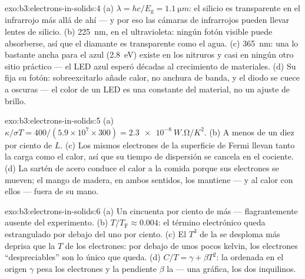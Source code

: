 \begin{solution}{exo:b3:electrons-in-solids:4}
(a) $\lambda = hc/E_{\text{g}} = \qty{1.1}{\micro m}$: el silicio es
transparente en el infrarrojo más allá de ahí --- y por eso las cámaras de
infrarrojos pueden llevar lentes de silicio. (b) \qty{225}{nm}, en el
ultravioleta: ningún fotón visible puede absorberse, así que el diamante es
transparente como el agua. (c) \qty{365}{nm}: una  lo bastante ancha para el azul
(\qty{2.8}{eV}) existe en los nitruros y casi en ningún otro sitio
práctico --- el LED azul esperó décadas al crecimiento de materiales.
(d) Su  fija su fotón: sobreexcitarlo añade calor, no anchura
de banda, y el diodo se cuece a oscuras --- el color de un LED es una
constante del material, no un ajuste de brillo.
\end{solution}

\begin{solution}{exo:b3:electrons-in-solids:5}
(a) $\kappa/\sigma T = 400/(5.9\times10^7\times300) =
\qty{2.3e-8}{W.\ohm/K^2}$. (b) A menos de un diez por ciento de $L$. (c)
Los mismos electrones de la superficie de Fermi llevan tanto la carga como el
calor, así que su tiempo de dispersión se cancela en el cociente. (d) La
sartén de acero conduce el calor a la comida porque sus electrones se mueven;
el mango de madera,  en ambos sentidos, los mantiene ---
y al calor con ellos --- fuera de su mano.
\end{solution}

\begin{solution}{exo:b3:electrons-in-solids:6}
(a) Un cincuenta por ciento de más --- flagrantemente ausente del experimento.
(b) $T/T_{\text{F}} \approx 0.004$: el término electrónico queda
estrangulado por debajo del uno por ciento. (c) El $T^3$ de la  se desploma
más deprisa que la $T$ de los electrones: por debajo de unos pocos kelvin, los
electrones ``despreciables'' son lo único que queda. (d) $C/T =
\gamma + \beta T^2$: la ordenada en el origen $\gamma$ pesa los electrones y
la pendiente $\beta$ la  --- una gráfica, los dos inquilinos.
\end{solution}


